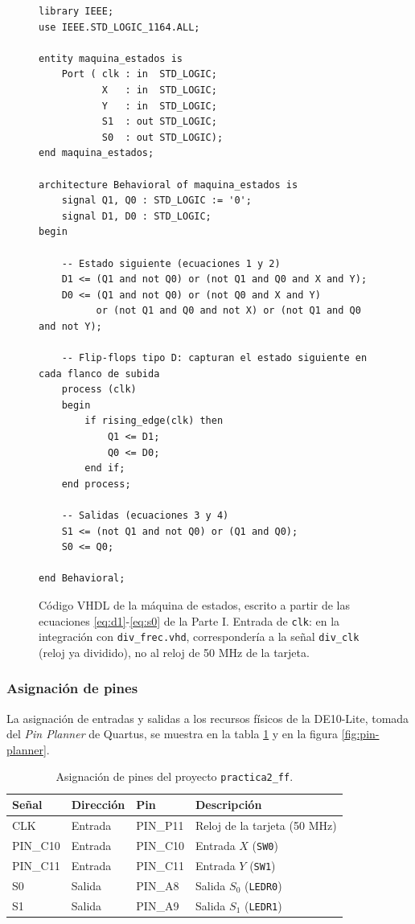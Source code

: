 \begin{figure}[H]
\begin{lstlisting}[style=hdl]
library IEEE;
use IEEE.STD_LOGIC_1164.ALL;

entity maquina_estados is
    Port ( clk : in  STD_LOGIC;
           X   : in  STD_LOGIC;
           Y   : in  STD_LOGIC;
           S1  : out STD_LOGIC;
           S0  : out STD_LOGIC);
end maquina_estados;

architecture Behavioral of maquina_estados is
    signal Q1, Q0 : STD_LOGIC := '0';
    signal D1, D0 : STD_LOGIC;
begin

    -- Estado siguiente (ecuaciones 1 y 2)
    D1 <= (Q1 and not Q0) or (not Q1 and Q0 and X and Y);
    D0 <= (Q1 and not Q0) or (not Q0 and X and Y)
          or (not Q1 and Q0 and not X) or (not Q1 and Q0 and not Y);

    -- Flip-flops tipo D: capturan el estado siguiente en cada flanco de subida
    process (clk)
    begin
        if rising_edge(clk) then
            Q1 <= D1;
            Q0 <= D0;
        end if;
    end process;

    -- Salidas (ecuaciones 3 y 4)
    S1 <= (not Q1 and not Q0) or (Q1 and Q0);
    S0 <= Q0;

end Behavioral;
\end{lstlisting}
\caption{Código VHDL de la máquina de estados, escrito a partir de las ecuaciones
  \ref{eq:d1}-\ref{eq:s0} de la Parte I. Entrada de \texttt{clk}: en la integración con
  \texttt{div\_frec.vhd}, correspondería a la señal \texttt{div\_clk} (reloj ya
  dividido), no al reloj de 50 MHz de la tarjeta.}
\label{fig:vhdl-maquina}
\end{figure}

\subsubsection{Asignación de pines}

La asignación de entradas y salidas a los recursos físicos de la DE10-Lite, tomada del
\textit{Pin Planner} de Quartus, se muestra en la tabla \ref{tab:pines} y en la figura
\ref{fig:pin-planner}.

\begin{table}[H]
  \centering
  \begin{tabular}{llll}
    \toprule
    Señal & Dirección & Pin & Descripción \\
    \midrule
    CLK & Entrada & PIN\_P11 & Reloj de la tarjeta (50 MHz) \\
    PIN\_C10 & Entrada & PIN\_C10 & Entrada $X$ (\texttt{SW0}) \\
    PIN\_C11 & Entrada & PIN\_C11 & Entrada $Y$ (\texttt{SW1}) \\
    S0 & Salida & PIN\_A8 & Salida $S_0$ (\texttt{LEDR0}) \\
    S1 & Salida & PIN\_A9 & Salida $S_1$ (\texttt{LEDR1}) \\
    \bottomrule
  \end{tabular}
  \caption{Asignación de pines del proyecto \texttt{practica2\_ff}.}
  \label{tab:pines}
\end{table}

